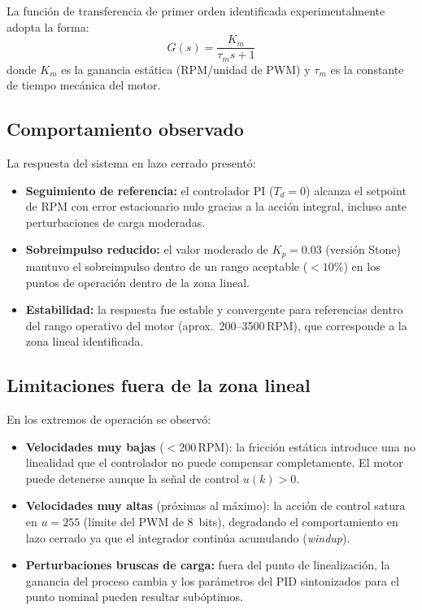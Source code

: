 \documentclass[journal, onecolumn]{IEEEtran}
\begin{document}
La función de transferencia de primer orden identificada experimentalmente
adopta la forma:
\[
  G(s) = \frac{K_m}{\tau_m s + 1}
\]
donde $K_m$ es la ganancia estática (RPM/unidad de PWM) y $\tau_m$ es la
constante de tiempo mecánica del motor.

\subsection{Comportamiento observado}

La respuesta del sistema en lazo cerrado presentó:
\begin{itemize}
  \item \textbf{Seguimiento de referencia:} el controlador PI ($T_d = 0$)
        alcanza el setpoint de RPM con error estacionario nulo gracias a la
        acción integral, incluso ante perturbaciones de carga moderadas.
  \item \textbf{Sobreimpulso reducido:} el valor moderado de $K_p = 0.03$
        (versión Stone) mantuvo el sobreimpulso dentro de un rango aceptable
        ($<10\%$) en los puntos de operación dentro de la zona lineal.
  \item \textbf{Estabilidad:} la respuesta fue estable y convergente para
        referencias dentro del rango operativo del motor (aprox.\
        200–3500\,RPM), que corresponde a la zona lineal identificada.
\end{itemize}

\subsection{Limitaciones fuera de la zona lineal}

En los extremos de operación se observó:
\begin{itemize}
  \item \textbf{Velocidades muy bajas} ($<\!\!200\,\text{RPM}$): la fricción
        estática introduce una no linealidad que el controlador no puede
        compensar completamente. El motor puede detenerse aunque la señal de
        control $u(k) > 0$.
  \item \textbf{Velocidades muy altas} (próximas al máximo): la acción de
        control satura en $u = 255$ (límite del PWM de 8~bits), degradando el
        comportamiento en lazo cerrado ya que el integrador continúa
        acumulando (\textit{windup}).
  \item \textbf{Perturbaciones bruscas de carga:} fuera del punto de
        linealización, la ganancia del proceso cambia y los parámetros del PID
        sintonizados para el punto nominal pueden resultar subóptimos.
\end{itemize}
\end{document}
